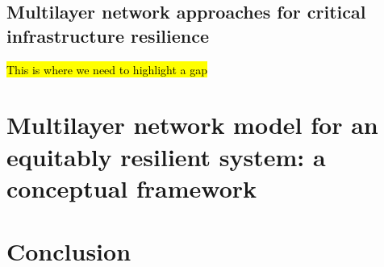 \documentclass[11pt,twoside]{article}
\numberwithin{equation}{section}
\newcommand{\?}{\stackrel{?}{=}}
\begin{document}
\subsection{Multilayer network approaches for critical infrastructure resilience}
\hl{This is where we need to highlight a gap}

\section{Multilayer network model for an equitably resilient system: a conceptual framework}



\section{Conclusion}


\printbibliography
\end{document}
